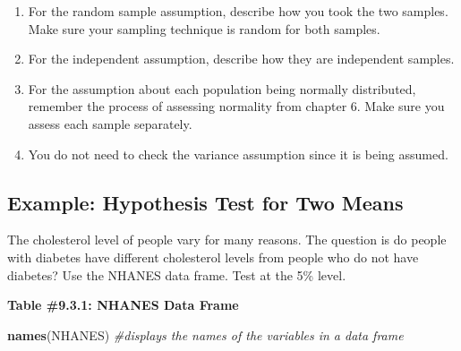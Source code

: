 \documentclass[]{book}
\newenvironment{Shaded}{\begin{snugshade}}{\end{snugshade}}
\newcommand{\CommentTok}[1]{\textcolor[rgb]{0.56,0.35,0.01}{\textit{#1}}}
\newcommand{\KeywordTok}[1]{\textcolor[rgb]{0.13,0.29,0.53}{\textbf{#1}}}
\newcommand{\NormalTok}[1]{#1}
\begin{document}
\begin{enumerate}
\def\labelenumi{\arabic{enumi}.}
\item
  For the random sample assumption, describe how you took the two samples. Make sure your sampling technique is random for both samples.
\item
  For the independent assumption, describe how they are independent samples.
\item
  For the assumption about each population being normally distributed, remember the process of assessing normality from chapter 6. Make sure you assess each sample separately.
\item
  You do not need to check the variance assumption since it is being assumed.
\end{enumerate}

\hypertarget{example-hypothesis-test-for-two-means}{%
\subsection{Example: Hypothesis Test for Two Means}\label{example-hypothesis-test-for-two-means}}

The cholesterol level of people vary for many reasons. The question is do people with diabetes have different cholesterol levels from people who do not have diabetes? Use the NHANES data frame. Test at the 5\% level.

\textbf{Table \#9.3.1: NHANES Data Frame}

\begin{Shaded}
\begin{Highlighting}[]
\KeywordTok{names}\NormalTok{(NHANES) }\CommentTok{#displays the names of the variables in a data frame}
\end{Highlighting}
\end{Shaded}
\end{document}
